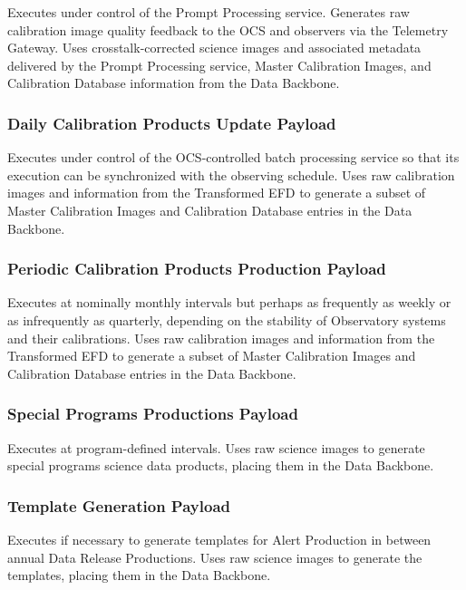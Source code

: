 \documentclass[DM,toc,lsstdraft]{lsstdoc}
\begin{document}
Executes under control of the Prompt Processing service. Generates raw
calibration image quality feedback to the OCS and observers via the
Telemetry Gateway. Uses crosstalk-corrected science images and
associated metadata delivered by the Prompt Processing service, Master
Calibration Images, and Calibration Database information from the Data
Backbone.

\subsubsection{Daily Calibration Products Update
Payload}\label{daily-calibration-products-update-payload}

Executes under control of the OCS-controlled batch processing service so
that its execution can be synchronized with the observing schedule. Uses
raw calibration images and information from the Transformed EFD to
generate a subset of Master Calibration Images and Calibration Database
entries in the Data Backbone.

\subsubsection{Periodic Calibration Products Production
Payload}\label{periodic-calibration-products-production-payload}

Executes at nominally monthly intervals but perhaps as frequently as weekly or as
infrequently as quarterly, depending on the stability of Observatory
systems and their calibrations. Uses raw calibration images and
information from the Transformed EFD to generate a subset of Master
Calibration Images and Calibration Database entries in the Data
Backbone.

\subsubsection{Special Programs Productions
Payload}\label{special-programs-productions-payload}

Executes at program-defined intervals.
Uses raw science images to generate special programs science data products, placing them in the Data Backbone.

\subsubsection{Template Generation
Payload}\label{template-generation-payload}

Executes if necessary to generate templates for Alert Production in between annual
Data Release Productions. Uses raw science images to generate the
templates, placing them in the Data Backbone.
\end{document}
